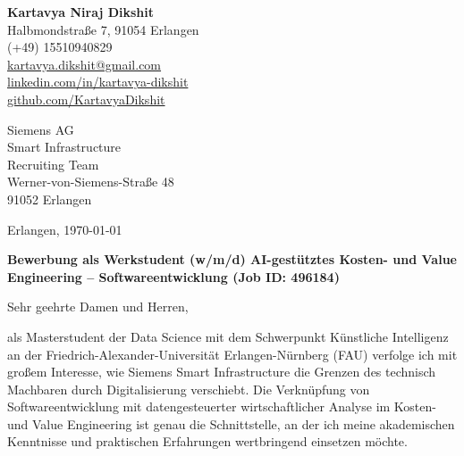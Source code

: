 \documentclass[a4paper,10pt]{article}
\begin{document}
\begin{flushleft}
    {\Huge \textbf{\color{primarycolor} Kartavya Niraj Dikshit}} \\
    \vspace{4pt}
    \small
    Halbmondstraße 7, 91054 Erlangen \\
    \faPhone* (+49) 15510940829 \\
    \faEnvelope \href{mailto:kartavya.dikshit@gmail.com}{kartavya.dikshit@gmail.com} \\
    \faLinkedin \href{http://www.linkedin.com/in/kartavya-dikshit}{linkedin.com/in/kartavya-dikshit} \\
    \faGithub \href{https://github.com/KartavyaDikshit}{github.com/KartavyaDikshit}
\end{flushleft}

\vspace{20pt}

\begin{flushleft}
    Siemens AG \\
    Smart Infrastructure \\
    Recruiting Team \\
    Werner-von-Siemens-Straße 48 \\
    91052 Erlangen
\end{flushleft}

\vspace{20pt}

\begin{flushright}
    Erlangen, \today
\end{flushright}

\vspace{10pt}

\noindent \textbf{\large Bewerbung als Werkstudent (w/m/d) AI-gestütztes Kosten- und Value Engineering – Softwareentwicklung (Job ID: 496184)}

\vspace{20pt}

Sehr geehrte Damen und Herren,

als Masterstudent der Data Science mit dem Schwerpunkt Künstliche Intelligenz an der Friedrich-Alexander-Universität Erlangen-Nürnberg (FAU) verfolge ich mit großem Interesse, wie Siemens Smart Infrastructure die Grenzen des technisch Machbaren durch Digitalisierung verschiebt. Die Verknüpfung von Softwareentwicklung mit datengesteuerter wirtschaftlicher Analyse im Kosten- und Value Engineering ist genau die Schnittstelle, an der ich meine akademischen Kenntnisse und praktischen Erfahrungen wertbringend einsetzen möchte.
\end{document}
